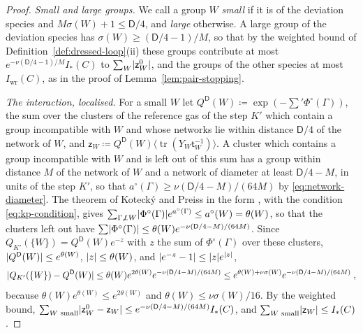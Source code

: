 \documentclass[11pt]{preprint}
\newcommand{\tr}{\operatorname{tr}}
\DeclarePairedDelimiter{\abs}{\lvert}{\rvert}
\numberwithin{equation}{section}
\theoremstyle{definition}
\theoremstyle{remark}
\theoremstyle{plain}
\begin{document}
\begin{proof}
\emph{Small and large groups.} We call a group $W$ \emph{small} if it is of the deviation species and $M\sigma(W) + 1 \leq \mathsf D/4$, and \emph{large} otherwise. A large group of the deviation species has $\sigma(W) \geq (\mathsf D/4 - 1)/M$, so that by the weighted bound of Definition~\ref{def:dressed-loop}(ii) these groups contribute at most $e^{-\nu(\mathsf D/4 - 1)/M}I_*(C)$ to $\sum_W\abs{\mathsf z^0_W}$, and the groups of the other species at most $I_{\mathrm{wr}}(C)$, as in the proof of Lemma~\ref{lem:pair-stopping}.

\emph{The interaction, localised.} For a small $W$ let $Q^{\mathsf D}(W) \coloneqq \exp(-\sum'\Phi^\circ(\Gamma))$, the sum over the clusters of the reference gas of the step $K'$ which contain a group incompatible with $W$ and whose networks lie within distance $\mathsf D/4$ of the network of $W$, and $\mathsf z_W \coloneqq Q^{\mathsf D}(W)\langle\tr(Y_W\mathsf t_W^{-1})\rangle$. A cluster which contains a group incompatible with $W$ and is left out of this sum has a group within distance $M$ of the network of $W$ and a network of diameter at least $\mathsf D/4 - M$, in units of the step $K'$, so that $a^\circ(\Gamma) \geq \nu(\mathsf D/4 - M)/(64M)$ by \eqref{eq:network-diameter}. The theorem of Koteck\'y and Preiss in the form \cite[Theorem~5.4]{FriedliVelenik}, with the condition \eqref{eq:kp-condition}, gives $\sum_{\Gamma \not\perp W}\abs{\Phi^\circ(\Gamma)}e^{a^\circ(\Gamma)} \leq a^\circ(W) = \theta(W)$, so that the clusters left out have $\sum\abs{\Phi^\circ(\Gamma)} \leq \theta(W)e^{-\nu(\mathsf D/4 - M)/(64M)}$. Since $Q_{K'}(\{ W \}) = Q^{\mathsf D}(W)e^{-z}$ with $z$ the sum of $\Phi^\circ(\Gamma)$ over these clusters, $\abs{Q^{\mathsf D}(W)} \leq e^{\theta(W)}$, $\abs{z} \leq \theta(W)$, and $\abs{e^{-z} - 1} \leq \abs{z}e^{\abs{z}}$,
\begin{equation}\label{eq:localised-interaction}
    \abs{Q_{K'}(\{ W \}) - Q^{\mathsf D}(W)} \leq \theta(W)e^{2\theta(W)}e^{-\nu(\mathsf D/4 - M)/(64M)} \leq e^{\theta(W) + \nu\sigma(W)}e^{-\nu(\mathsf D/4 - M)/(64M)}\;,
\end{equation}
because $\theta(W)e^{\theta(W)} \leq e^{2\theta(W)}$ and $\theta(W) \leq \nu\sigma(W)/16$. By the weighted bound, $\sum_{W \text{ small}}\abs{\mathsf z^0_W - \mathsf z_W} \leq e^{-\nu(\mathsf D/4 - M)/(64M)}I_*(C)$, and $\sum_{W \text{ small}}\abs{\mathsf z_W} \leq I_*(C)$.


\end{proof}
\end{document}
